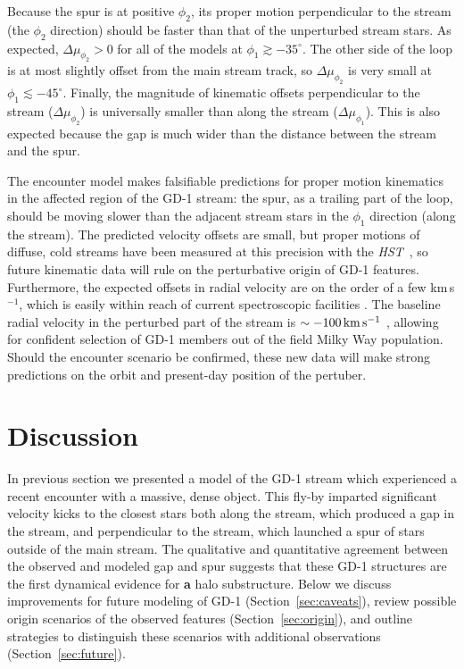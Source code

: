 \documentclass[twocolumn]{aastex62}
\newcommand{\hst}{\textsl{HST}}
\newcommand{\changes}[1]{{\textbf{#1}}}
\begin{document}
Because the spur is at positive $\phi_2$, its proper motion perpendicular to the stream (the $\phi_2$ direction) should be faster than that of the unperturbed stream stars.
As expected, $\Delta\mu_{\phi_2}>0$ for all of the models at $\phi_1\gtrsim-35^\circ$.
The other side of the loop is at most slightly offset from the main stream track, so $\Delta\mu_{\phi_2}$ is very small at $\phi_1\lesssim-45^\circ$.
Finally, the magnitude of kinematic offsets perpendicular to the stream ($\Delta\mu_{\phi_2}$) is universally smaller than along the stream ($\Delta\mu_{\phi_1}$).
This is also expected because the gap is much wider than the distance between the stream and the spur.

The encounter model makes falsifiable predictions for proper motion kinematics in the affected region of the GD-1 stream: the spur, as a trailing part of the loop, should be moving slower than the adjacent stream stars in the $\phi_1$ direction (along the stream).
The predicted velocity offsets are small, but proper motions of diffuse, cold streams have been measured at this precision with the \hst\ \citep{sohn2016}, so future kinematic data will rule on the perturbative origin of GD-1 features.
Furthermore, the expected offsets in radial velocity are on the order of a few km\,s$^{-1}$, which is easily within reach of current spectroscopic facilities \citep[e.g.,][]{sg2007}.
The baseline radial velocity in the perturbed part of the stream is $\sim-100\,\rm km\,s^{-1}$ \citep{koposov2010}, allowing for confident selection of GD-1 members out of the field Milky Way population.
Should the encounter scenario be confirmed, these new data will make strong predictions on the orbit and present-day position of the pertuber.


\section{Discussion}
\label{sec:discussion}
In previous section we presented a model of the GD-1 stream which experienced a recent encounter with a massive, dense object.
This fly-by imparted significant velocity kicks to the closest stars both along the stream, which produced a gap in the stream, and perpendicular to the stream, which launched a spur of stars outside of the main stream.
The qualitative and quantitative agreement between the observed and modeled gap and spur suggests that these GD-1 structures are the first dynamical evidence for \changes{a} halo substructure.
Below we discuss improvements for future modeling of GD-1 (Section~\ref{sec:caveats}), review possible origin scenarios of the observed features (Section~\ref{sec:origin}), and outline strategies to distinguish these scenarios with additional observations (Section~\ref{sec:future}).
\end{document}
